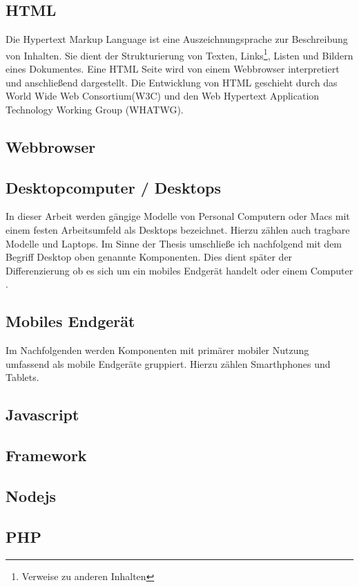 		\subsection{HTML}
		Die Hypertext Markup Language ist eine Auszeichnungsprache zur Beschreibung von Inhalten. Sie dient der Strukturierung 		von Texten, Links\footnote{Verweise zu anderen Inhalten}, Listen und Bildern eines Dokumentes. Eine HTML Seite wird von 		einem Webbrowser interpretiert und anschließend dargestellt. Die Entwicklung von HTML geschieht durch das World Wide 		Web Consortium(W3C) und den Web Hypertext Application Technology Working Group (WHATWG). 

		\subsection{Webbrowser}
		\subsection{Desktopcomputer / Desktops}
		In dieser Arbeit werden gängige Modelle von Personal Computern oder Macs mit einem festen Arbeitsumfeld als Desktops 		bezeichnet. Hierzu zählen auch tragbare Modelle und Laptops. Im Sinne der Thesis umschließe ich nachfolgend mit dem 		Begriff Desktop oben genannte Komponenten. Dies dient später der Differenzierung ob es sich um ein mobiles Endgerät 			handelt oder einem Computer .

		\subsection{Mobiles Endgerät}
		Im Nachfolgenden werden Komponenten mit primärer mobiler Nutzung umfassend als mobile Endgeräte gruppiert. Hierzu 		zählen Smarthphones und Tablets.

		\subsection{Javascript}
		\subsection{Framework}
		\subsection{Nodejs}
		\subsection{PHP}
